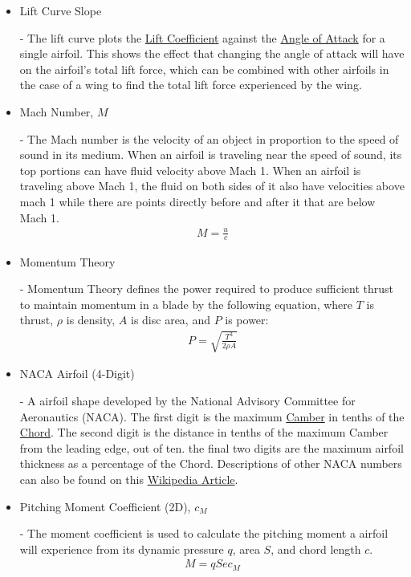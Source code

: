 \documentclass{article}
\begin{document}
\begin{itemize}
	\item \hypertarget{LC}{Lift Curve Slope} - The lift curve plots the \hyperlink{CL}{Lift Coefficient} against the \hyperlink{alpha}{Angle of Attack} for a single airfoil. This shows the effect that changing the angle of attack will have on the airfoil's total lift force, which can be combined with other airfoils in the case of a wing to find the total lift force experienced by the wing.
		
	\item \hypertarget{M}{Mach Number, $M$} - The Mach number is the velocity of an object in proportion to the speed of sound in its medium. When an airfoil is traveling near the speed of sound, its top portions can have fluid velocity above Mach 1. When an airfoil is traveling above Mach 1, the fluid on both sides of it also have velocities above mach 1 while there are points directly before and after it that are below Mach 1.
		\begin{equation} \label{eq:15}
		\begin{aligned}
        			M = \frac{u}{c}
	    	\end{aligned}
		\end{equation}
	
	\item \hypertarget{MT}{Momentum Theory} - Momentum Theory defines the power required to produce sufficient thrust to maintain momentum in a blade by the following equation, where $T$ is thrust, $\rho$ is density, $A$ is disc area, and $P$ is power:
	\begin{equation}
	\begin{aligned}
        		P = \sqrt{\frac{T^{3}}{2 \rho A}}
	\end{aligned}
	\end{equation}
		
	\item \hypertarget{NACA}{NACA Airfoil (4-Digit)} - A airfoil shape developed by the National Advisory Committee for Aeronautics (NACA). The first digit is the maximum \hyperlink{Camber}{Camber} in tenths of the \hyperlink{c}{Chord}. The second digit is the distance in tenths of the maximum Camber from the leading edge, out of ten. the final two digits are the maximum airfoil thickness as a percentage of the Chord. Descriptions of other NACA numbers can also be found on this \href{https://en.wikipedia.org/wiki/NACA_airfoil}{Wikipedia Article}. 
		
	\item \hypertarget{CM}{Pitching Moment Coefficient (2D), $c_{M}$} - The moment coefficient is used to calculate the pitching moment a airfoil will experience from its dynamic pressure $q$, area $S$, and chord length $c$.
		\begin{equation} \label{eq:16}
		\begin{aligned}
        			M = q S e c_{M}
	    	\end{aligned}
		\end{equation}
	

\end{itemize}
\end{document}
